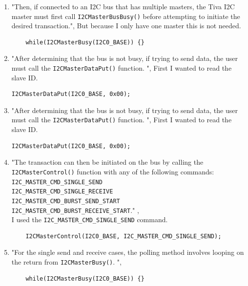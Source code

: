\documentclass[12pt]{article}
\begin{document}
\begin{enumerate}
   \item "Then, if connected to an I2C bus that has multiple
masters, the Tiva I2C master must first call \texttt{I2CMasterBusBusy()} before attempting to initiate the
desired transaction.",\cite[page 315]{UG} But because I only have one master this is not needed. 
\begin{lstlisting}  
    while(I2CMasterBusy(I2C0_BASE)) {}
     \end{lstlisting}    
     
        \item "After determining that the bus is not busy, if trying to send data, the user must
call the \texttt{I2CMasterDataPut()} function. ",\cite[page 315]{UG} First I wanted to read the slave ID.
\begin{lstlisting}  
I2CMasterDataPut(I2C0_BASE, 0x00);
\end{lstlisting}  
     
\item "After determining that the bus is not busy, if trying to send data, the user must
call the \texttt{I2CMasterDataPut()} function. ",\cite[page 315]{UG} First I wanted to read the slave ID.
\begin{lstlisting}  
I2CMasterDataPut(I2C0_BASE, 0x00);
\end{lstlisting}  
      

\item "The transaction can then be initiated on the bus by calling
the \texttt{I2CMasterControl()} function with any of the following commands: \\
\texttt{I2C\_MASTER\_CMD\_SINGLE\_SEND} \\
\texttt{I2C\_MASTER\_CMD\_SINGLE\_RECEIVE} \\
\texttt{I2C\_MASTER\_CMD\_BURST\_SEND\_START} \\
\texttt{I2C\_MASTER\_CMD\_BURST\_RECEIVE\_START}."
,\cite[page 315]{UG} \\ I used the \texttt{I2C\_MASTER\_CMD\_SINGLE\_SEND} command.
\begin{lstlisting}  
    I2CMasterControl(I2C0_BASE, I2C_MASTER_CMD_SINGLE_SEND);
\end{lstlisting}  
       
\item "For the single send and receive cases, the polling method involves looping on the return from
\texttt{I2CMasterBusy()}. ",\cite[page 316]{UG} 
\begin{lstlisting}  
    while(I2CMasterBusy(I2C0_BASE)) {}
\end{lstlisting} 


\end{enumerate}
\end{document}

